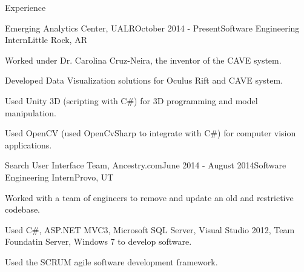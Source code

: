 \documentclass{resume} %
\begin{document}
\begin{rSection}{Experience}

\begin{rSubsection}{Emerging Analytics Center, UALR}{October 2014 - Present}{Software Engineering Intern}{Little Rock, AR}

	\item Worked under Dr. Carolina Cruz-Neira, the inventor of the CAVE system.
	\item Developed Data Visualization solutions for Oculus Rift and CAVE system.
	\item Used Unity 3D (scripting with C\#) for 3D programming and model manipulation.
	\item Used OpenCV (used OpenCvSharp to integrate with C\#) for computer vision applications.
\end{rSubsection}

\begin{rSubsection}{Search User Interface Team, Ancestry.com}{June 2014 - August 2014}{Software Engineering Intern}{Provo, UT}

    \item Worked with a team of engineers to remove and update an old and restrictive codebase.
    \item Used C\#, ASP.NET MVC3, Microsoft SQL Server, Visual Studio 2012, Team Foundatin Server, Windows 7 to develop software.
	\item Used the SCRUM agile software development framework.
\end{rSubsection}

\end{rSection}

\end{document}
